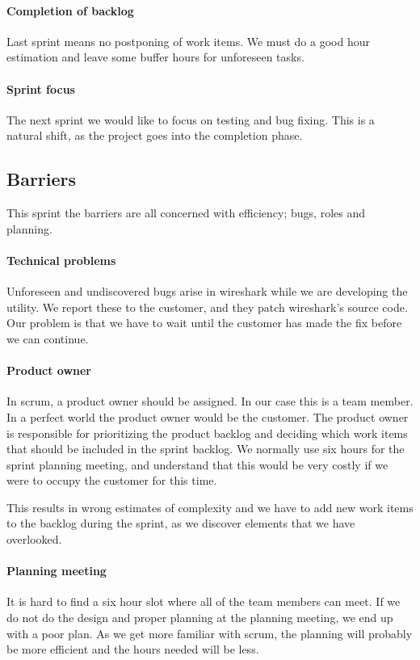 \paragraph{Completion of backlog}
Last sprint means no postponing of work items. We must do a good hour estimation and leave some buffer hours for unforeseen tasks.

\paragraph{Sprint focus}
The next sprint we would like to focus on testing and bug fixing. This is a natural shift, as the project goes into the completion phase. 

\subsection{Barriers}
This sprint the barriers are all concerned with efficiency; bugs, roles and planning.

\paragraph{Technical problems} 
Unforeseen and undiscovered bugs arise in \Gls{wireshark} while we are developing the \gls{utility}. We report these to the customer, and they patch \Gls{wireshark}'s source code. Our problem is that we have to wait until the customer has made the fix before we can continue.

\paragraph{Product owner}
In \Gls{scrum}, a product owner should be assigned. In our case this is a team member. In a perfect world the product owner would be the customer. The product owner is responsible for prioritizing the product backlog and deciding which work items that should be included in the sprint backlog. We normally use six hours for the sprint planning meeting, and understand that this would be very costly if we were to occupy the customer for this time.

This results in wrong estimates of complexity and we have to add new work items to the backlog during the sprint, as we discover elements that we have overlooked. 

\paragraph{Planning meeting}
It is hard to find a six hour slot where all of the team members can meet. If we do not do the design and proper planning at the planning meeting, we end up with a poor plan. As we get more familiar with \Gls{scrum}, the planning will probably be more efficient and the hours needed will be less. 

